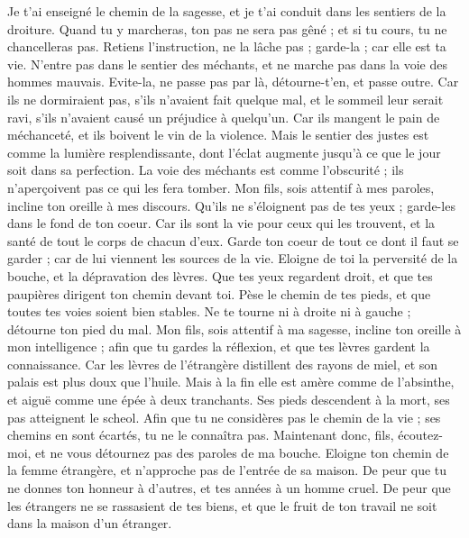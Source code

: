 \begin{multicols}{2}
Je t'ai enseigné le chemin de la sagesse, et je t'ai conduit dans les sentiers de la droiture.
Quand tu y marcheras, ton pas ne sera pas gêné ; et si tu cours, tu ne chancelleras pas.
Retiens l'instruction, ne la lâche pas ; garde-la ; car elle est ta vie.
N'entre pas dans le sentier des méchants, et ne marche pas dans la voie des hommes mauvais.
Evite-la, ne passe pas par là, détourne-t'en, et passe outre.
Car ils ne dormiraient pas, s'ils n'avaient fait quelque mal, et le sommeil leur serait ravi, s'ils n'avaient causé un préjudice à quelqu'un.
Car ils mangent le pain de méchanceté, et ils boivent le vin de la violence.
Mais le sentier des justes est comme la lumière resplendissante, dont l’éclat augmente jusqu’à ce que le jour soit dans sa perfection.
La voie des méchants est comme l'obscurité ; ils n’aperçoivent pas ce qui les fera tomber.
Mon fils, sois attentif à mes paroles, incline ton oreille à mes discours.
Qu'ils ne s'éloignent pas de tes yeux ; garde-les dans le fond de ton coeur.
Car ils sont la vie pour ceux qui les trouvent, et la santé de tout le corps de chacun d’eux.
Garde ton coeur de tout ce dont il faut se garder ; car de lui viennent les sources de la vie.
Eloigne de toi la perversité de la bouche, et la dépravation des lèvres.
Que tes yeux regardent droit, et que tes paupières dirigent ton chemin devant toi.
Pèse le chemin de tes pieds, et que toutes tes voies soient bien stables.
Ne te tourne ni à droite ni à gauche ; détourne ton pied du mal.
\VerseOne{}Mon fils, sois attentif à ma sagesse, incline ton oreille à mon intelligence ;
afin que tu gardes la réflexion, et que tes lèvres gardent la connaissance.
Car les lèvres de l'étrangère distillent des rayons de miel, et son palais est plus doux que l'huile.
Mais à la fin elle est amère comme de l'absinthe, et aiguë comme une épée à deux tranchants.
Ses pieds descendent à la mort, ses pas atteignent le scheol.
Afin que tu ne considères pas le chemin de la vie ; ses chemins en sont écartés, tu ne le connaîtra pas.
Maintenant donc, fils, écoutez-moi, et ne vous détournez pas des paroles de ma bouche.
Eloigne ton chemin de la femme étrangère, et n'approche pas de l'entrée de sa maison.
De peur que tu ne donnes ton honneur à d'autres, et tes années à un homme cruel.
De peur que les étrangers ne se rassasient de tes biens, et que le fruit de ton travail ne soit dans la maison d’un étranger.

\end{multicols}
